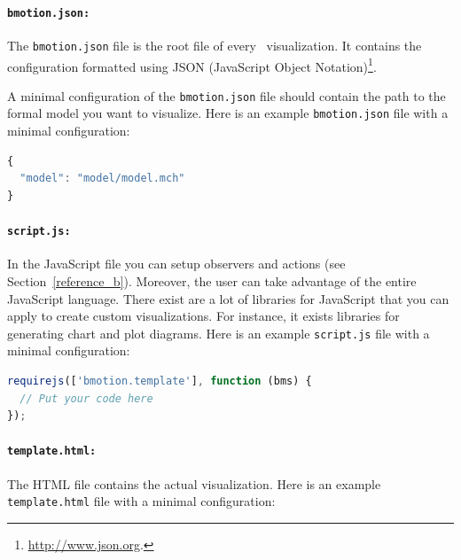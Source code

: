 \paragraph{\texttt{bmotion.json:}}
The \texttt{bmotion.json} file is the root file of every \bms\ visualization.
It contains the configuration formatted using JSON (JavaScript Object Notation)\footnote{\url{http://www.json.org}.}.


A minimal configuration of the \texttt{bmotion.json} file should contain the path to the formal model you want to visualize.
Here is an example \texttt{bmotion.json} file with a minimal configuration:

\begin{lstlisting}[language=JavaScript]
{
  "model": "model/model.mch"
}
\end{lstlisting}


\paragraph{\texttt{script.js:}}
In the JavaScript file you can setup observers and actions (see Section~\ref{reference_b}).
Moreover, the user can take advantage of the entire JavaScript language.
There exist are a lot of libraries for JavaScript that you can apply to create custom visualizations.
For instance, it exists libraries for generating chart and plot diagrams.
Here is an example \texttt{script.js} file with a minimal configuration:

\begin{lstlisting}[language=JavaScript]
requirejs(['bmotion.template'], function (bms) {
  // Put your code here
});
\end{lstlisting}


\paragraph{\texttt{template.html:}}
The HTML file contains the actual visualization.
Here is an example \texttt{template.html} file with a minimal configuration:

